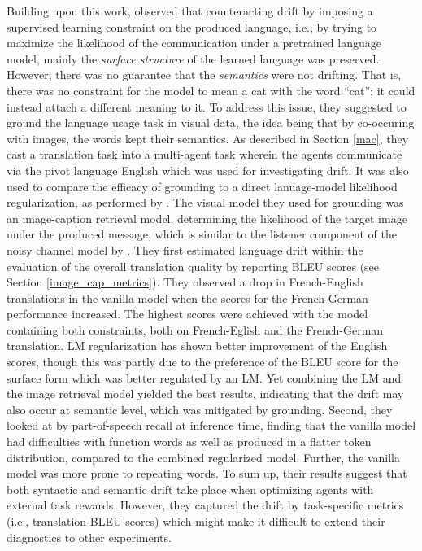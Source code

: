 Building upon this work, \cite{lee2019countering} observed that counteracting drift by imposing a supervised learning constraint on the produced language, i.e., by trying to maximize the likelihood of the communication under a pretrained language model, mainly the \textit{surface structure} of the learned language was preserved. However, there was no guarantee that the \textit{semantics} were not drifting. That is, there was no constraint for the model to mean a cat with the word ``cat''; it could instead attach a different meaning to it.  To address this issue, they suggested to ground the language usage task in visual data, the idea being that by co-occuring with images, the words kept their semantics. As described in Section \ref{mac}, they cast a translation task into a multi-agent task wherein the agents communicate via the pivot language English which was used for investigating drift. It was also used to compare the efficacy of grounding to a direct lanuage-model likelihood regularization, as performed by \cite{lewis2017deal}. The visual model they used for grounding was an image-caption retrieval model, determining the likelihood of the target image under the produced message, which is similar to the listener component of the noisy channel model by \cite{lazaridou2020multi}.
They first estimated language drift within the evaluation of the overall translation quality by reporting BLEU scores (see Section \ref{image_cap_metrics}). They observed a drop in French-English translations in the vanilla model when the scores for the French-German performance increased. The highest scores were achieved with the model containing both constraints, both on French-Eglish and the French-German translation. LM regularization has shown better improvement of the English scores, though this was partly due to the preference of the BLEU score for the surface form which was better regulated by an LM. Yet combining the LM and the image retrieval model yielded the best results, indicating that the drift may also occur at semantic level, which was mitigated by grounding. Second, they looked at by part-of-speech recall at inference time, finding that the vanilla model had difficulties with function words as well as produced in a flatter token distribution, compared to the combined regularized model. Further, the vanilla model was more prone to repeating words. To sum up, their results suggest that both syntactic and semantic drift take place when optimizing agents with external task rewards. However, they captured the drift by task-specific metrics (i.e., translation BLEU scores) which might make it difficult to extend their diagnostics to other experiments.

